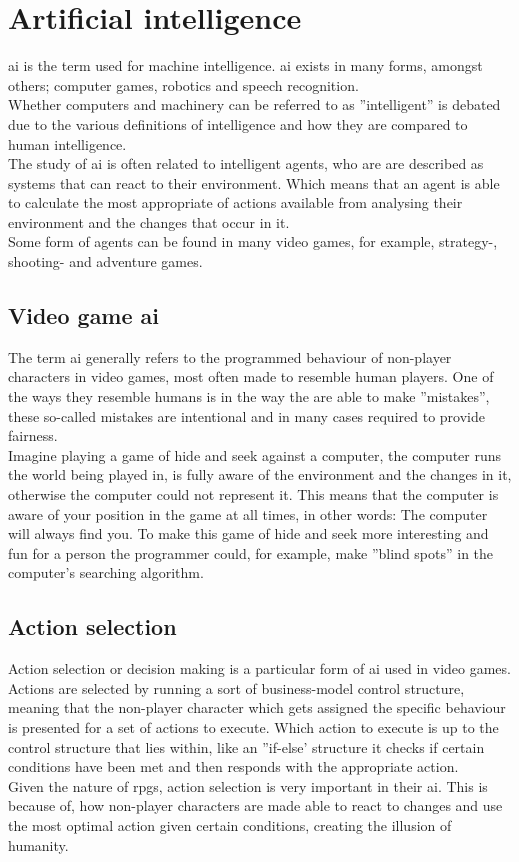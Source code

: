 \section{Artificial intelligence}
\ac{ai} is the term used for machine intelligence. \ac{ai} exists in many forms, amongst others; computer games, robotics and speech recognition.\\
Whether computers and machinery can be referred to as ''intelligent'' is debated due to the various definitions of intelligence and how they are compared to human intelligence.\\
The study of \ac{ai} is often related to intelligent agents, who are are described as systems that can react to their environment. Which means that an agent is able to calculate the most appropriate of actions available from analysing their environment and the changes that occur in it.\\
Some form of agents can be found in many video games, for example, strategy-, shooting- and adventure games.\cite{artint}

\subsection{Video game \ac{ai}}
The term \ac{ai} generally refers to the programmed behaviour of non-player characters in video games, most often made to resemble human players. One of the ways they resemble humans is in the way the are able to make ''mistakes'', these so-called mistakes are intentional and in many cases required to provide fairness.\\
Imagine playing a game of hide and seek against a computer, the computer runs the world being played in, is fully aware of the environment and the changes in it, otherwise the computer could not represent it. This means that the computer is aware of your position in the game at all times, in other words: The computer will always find you. To make this game of hide and seek more interesting and fun for a person the programmer could, for example, make ''blind spots'' in the computer's searching algorithm.\cite{videoint}

\subsection{Action selection}
\label{analysis:action}
Action selection or decision making is a particular form of \ac{ai} used in video games. Actions are selected by running a sort of business-model control structure, meaning that the non-player character which gets assigned the specific behaviour is presented for a set of actions to execute. Which action to execute is up to the control structure that lies within, like an ''if-else' structure it checks if certain conditions have been met and then responds with the appropriate action.\cite{actionselect}\\
Given the nature of \ac{rpgs}, action selection is very important in their \ac{ai}. This is because of, how non-player characters are made able to react to changes and use the most optimal action given certain conditions, creating the illusion of humanity.